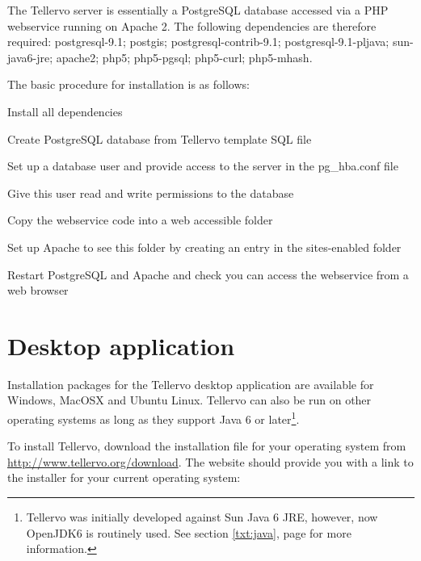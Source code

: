 The Tellervo server is essentially a PostgreSQL database accessed via a PHP webservice running on Apache 2.  The following dependencies are therefore required: postgresql-9.1; postgis; postgresql-contrib-9.1; postgresql-9.1-pljava; sun-java6-jre; apache2; php5; php5-pgsql; php5-curl; php5-mhash.

The basic procedure for installation is as follows:

\begin{itemize*}
 \item Install all dependencies
 \item Create PostgreSQL database from Tellervo template SQL file
 \item Set up a database user and provide access to the server in the pg\_hba.conf file
 \item Give this user read and write permissions to the database
 \item Copy the webservice code into a web accessible folder
 \item Set up Apache to see this folder by creating an entry in the sites-enabled folder
 \item Restart PostgreSQL and Apache and check you can access the webservice from a web browser
\end{itemize*}




\section{Desktop application}
\label{txt:desktopinstall}
Installation packages for the Tellervo desktop application are available for Windows, MacOSX and Ubuntu Linux.  Tellervo can also be run on other operating systems as long as they support Java 6 or later\footnote{Tellervo was initially developed against Sun Java 6 JRE, however, now OpenJDK6 is routinely used.  See section \ref{txt:java}, page \pageref{txt:java} for more information.}.

To install Tellervo, download the installation file for your operating system from \url{http://www.tellervo.org/download}. The website should provide you with a link to the installer for your current operating system:


